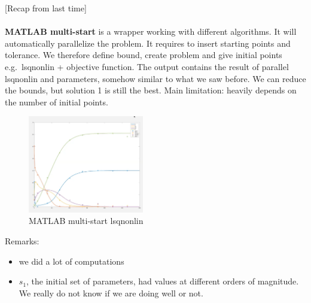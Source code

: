 {[}Recap from last time{]}
\\
\\
\noindent
\textbf{MATLAB multi-start} is a wrapper working with different
algorithms. It will automatically parallelize the problem. It requires
to insert starting points and tolerance. We therefore define bound,
create problem and give initial points e.g.~lsqnonlin + objective
function. The output contains the result of parallel lsqnonlin and
parameters, somehow similar to what we saw before. We can reduce the
bounds, but solution 1 is still the best. Main limitation: heavily
depends on the number of initial points.

\begin{figure}
\centering
\includegraphics[width=0.45\textwidth]{multistep.png}
\caption{MATLAB multi-start lsqnonlin}
\end{figure}

\noindent
Remarks:

\begin{itemize}
\tightlist
\item
  we did a lot of computations
\item
  $s_1$, the initial set of parameters, had values at different orders
  of magnitude. We really do not know if we are doing well or not.
\end{itemize}
